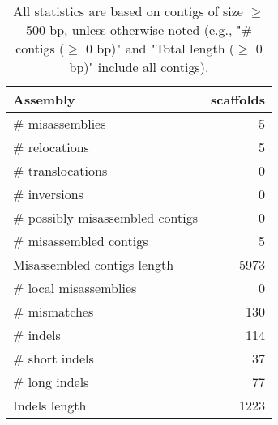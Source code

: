 \documentclass[12pt,a4paper]{article}
\begin{document}
\begin{table}[ht]
\begin{center}
\caption{All statistics are based on contigs of size $\geq$ 500 bp, unless otherwise noted (e.g., "\# contigs ($\geq$ 0 bp)" and "Total length ($\geq$ 0 bp)" include all contigs).}
\begin{tabular}{|l*{1}{|r}|}
\hline
Assembly & scaffolds \\ \hline
\# misassemblies & 5 \\ \hline
\hspace{5mm}\# relocations & 5 \\ \hline
\hspace{5mm}\# translocations & 0 \\ \hline
\hspace{5mm}\# inversions & 0 \\ \hline
\# possibly misassembled contigs & 0 \\ \hline
\# misassembled contigs & 5 \\ \hline
Misassembled contigs length & 5973 \\ \hline
\# local misassemblies & 0 \\ \hline
\# mismatches & 130 \\ \hline
\# indels & 114 \\ \hline
\hspace{5mm}\# short indels & 37 \\ \hline
\hspace{5mm}\# long indels & 77 \\ \hline
Indels length & 1223 \\ \hline
\end{tabular}
\end{center}
\end{table}
\end{document}
